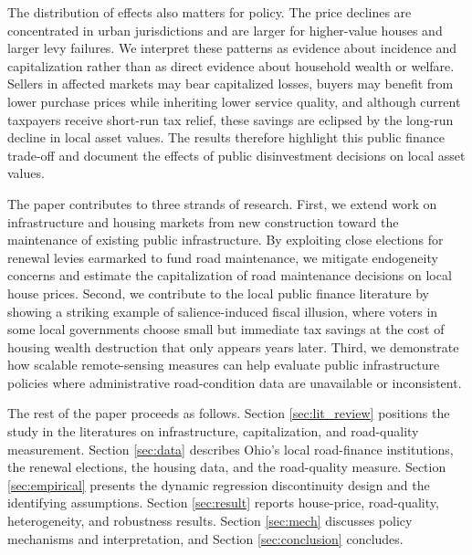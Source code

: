 The distribution of effects also matters for policy. The price declines are concentrated in urban jurisdictions and are larger for higher-value houses and larger levy failures. We interpret these patterns as evidence about incidence and capitalization rather than as direct evidence about household wealth or welfare. Sellers in affected markets may bear capitalized losses, buyers may benefit from lower purchase prices while inheriting lower service quality, and although current taxpayers receive short-run tax relief, these savings are eclipsed by the long-run decline in local asset values. The results therefore highlight this public finance trade-off and document the effects of public disinvestment decisions on local asset values.

The paper contributes to three strands of research. First, we extend work on infrastructure and housing markets from new construction toward the maintenance of existing public infrastructure. By exploiting close elections for renewal levies earmarked to fund road maintenance, we mitigate endogeneity concerns and estimate the capitalization of road maintenance decisions on local house prices. Second, we contribute to the local public finance literature by showing a striking example of salience-induced fiscal illusion, where voters in some local governments choose small but immediate tax savings at the cost of housing wealth destruction that only appears years later.
Third, we demonstrate how scalable remote-sensing measures can help evaluate public infrastructure policies where administrative road-condition data are unavailable or inconsistent.

The rest of the paper proceeds as follows. Section \ref{sec:lit_review} positions the study in the literatures on infrastructure, capitalization, and road-quality measurement. Section \ref{sec:data} describes Ohio's local road-finance institutions, the renewal elections, the housing data, and the road-quality measure. Section \ref{sec:empirical} presents the dynamic regression discontinuity design and the identifying assumptions. Section \ref{sec:result} reports house-price, road-quality, heterogeneity, and robustness results. Section \ref{sec:mech} discusses policy mechanisms and interpretation, and Section \ref{sec:conclusion} concludes.

